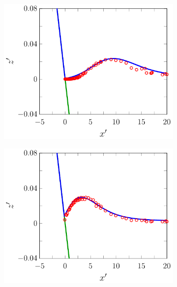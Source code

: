 \begin{figure}
	\centering
	\begin{subfigure}{0.5\textwidth}
		\includegraphics[width=\textwidth]{./chp6/figures/Experiment/Synolakis/H0p0185/FEVM/30s.pdf}
		\vspace{0.5cm}
	\end{subfigure}%
	\begin{subfigure}{0.5\textwidth}
		\includegraphics[width=\textwidth]{./chp6/figures/Experiment/Synolakis/H0p0185/FEVM/40s.pdf}
		\vspace{0.5cm}
	\end{subfigure}

\end{figure}
